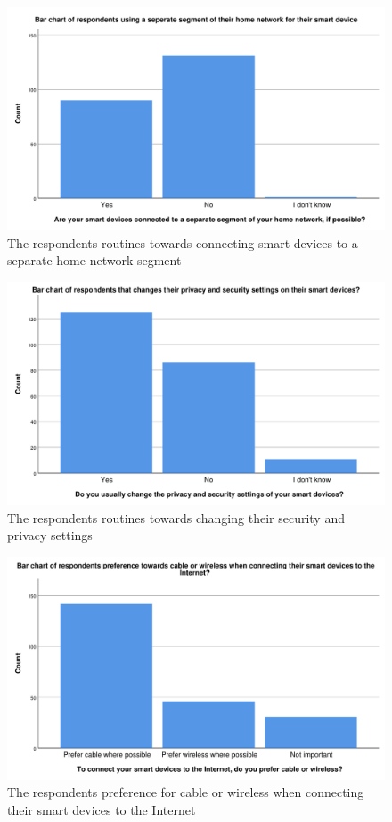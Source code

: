 \begin{figure}[H]
    \centering
    \includegraphics[scale=0.55]{figures/diagrams/separat_segment.pdf}
    \caption{The respondents routines towards connecting smart devices to a separate home network segment}
    \label{fig:separat_segment}
\end{figure}

\begin{figure}[H]
    \centering
    \includegraphics[scale=0.55]{figures/diagrams/settings.pdf}
    \caption{The respondents routines towards changing their security and privacy settings}
    \label{fig:settings}
\end{figure}

\begin{figure}[H]
    \centering
    \includegraphics[scale=0.55]{figures/diagrams/connect_internet.pdf}
    \caption{The respondents preference for cable or wireless when connecting their smart devices to the Internet}
    \label{fig:connect_internet}
\end{figure}


